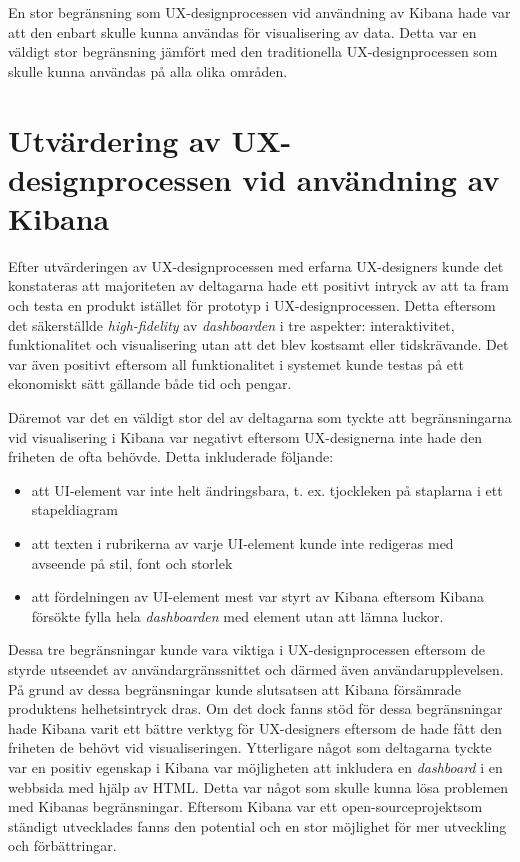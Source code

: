 \documentclass[12pt]{kththesis}
\begin{document}
En stor begränsning som UX-designprocessen vid användning av Kibana hade var att den enbart skulle kunna användas för visualisering av data. Detta var en väldigt stor begränsning jämfört med den traditionella UX-designprocessen som skulle kunna användas på alla olika områden. 

\section{Utvärdering av UX-designprocessen vid användning av Kibana}
Efter utvärderingen av UX-designprocessen med erfarna UX-designers kunde det konstateras att majoriteten av deltagarna hade ett positivt intryck av att ta fram och testa en produkt istället för prototyp i UX-designprocessen. Detta eftersom det säkerställde \textit{high-fidelity} av \textit{dashboarden} i tre aspekter: interaktivitet, funktionalitet och visualisering utan att det blev kostsamt eller tidskrävande. Det var även positivt eftersom all funktionalitet i systemet kunde testas på ett ekonomiskt sätt gällande både tid och pengar. 

Däremot var det en väldigt stor del av deltagarna som tyckte att begränsningarna vid visualisering i Kibana var negativt eftersom UX-designerna inte hade den friheten de ofta behövde. Detta inkluderade följande: 
\begin{itemize}
\item att UI-element var inte helt ändringsbara, t. ex. tjockleken på staplarna i ett stapeldiagram
\item att texten i rubrikerna av varje UI-element kunde inte redigeras med avseende på stil, font och storlek
\item att fördelningen av UI-element mest var styrt av Kibana eftersom Kibana försökte fylla hela \textit{dashboarden} med element utan att lämna luckor. 
\end{itemize}

Dessa tre begränsningar kunde vara viktiga i UX-designprocessen eftersom de styrde utseendet av användargränssnittet och därmed även användarupplevelsen. På grund av dessa begränsningar kunde slutsatsen att Kibana försämrade produktens helhetsintryck dras. Om det dock fanns stöd för dessa begränsningar hade Kibana varit ett bättre verktyg för UX-designers eftersom de hade fått den friheten de behövt vid visualiseringen. Ytterligare något som deltagarna tyckte var en positiv egenskap i Kibana var möjligheten att inkludera en \textit{dashboard} i en webbsida med hjälp av HTML. Detta var något som skulle kunna lösa problemen med Kibanas begränsningar. Eftersom Kibana var ett open-sourceprojektsom ständigt utvecklades fanns den potential och en stor möjlighet för mer utveckling och förbättringar.
\end{document}
